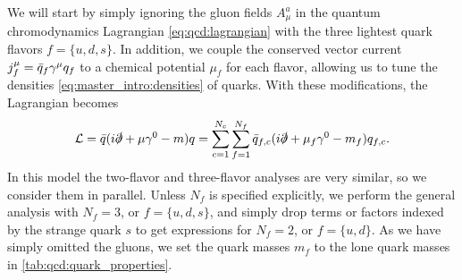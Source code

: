 We will start by simply ignoring the gluon fields $A_\mu^a$ in the quantum chromodynamics Lagrangian \eqref{eq:qcd:lagrangian}
with the three lightest quark flavors $f=\{u,d,s\}$.
In addition, we couple the conserved vector current $\smash{j_f^\mu} = \bar{q}_f \gamma^\mu q_f$ to a chemical potential $\mu_f$ for each flavor,
allowing us to tune the densities \eqref{eq:master_intro:densities} of quarks.
With these modifications, the Lagrangian becomes
\begin{equation}
	\mathcal{L} = \bar{q} (i \slashed\partial + \mu \gamma^0 - m) q
	      = \sum_{c=1}^{N_c} \sum_{f=1}^{\smash{N_f}} \bar{q}_{f,c} (i \slashed\partial + \mu_f \gamma^0 - m_f) q_{f,c} .
\label{eq:mit:lagrangian}
\end{equation}
In this model the two-flavor and three-flavor analyses are very similar, so we consider them in parallel.
Unless $N_f$ is specified explicitly, we perform the general analysis with $N_f=3$, or $f=\{u,d,s\}$,
and simply drop terms or factors indexed by the strange quark $s$ to get expressions for $N_f = 2$, or $f=\{u,d\}$.
As we have simply omitted the gluons, we set the quark masses $m_f$ to the lone quark masses in \cref{tab:qcd:quark_properties}.

